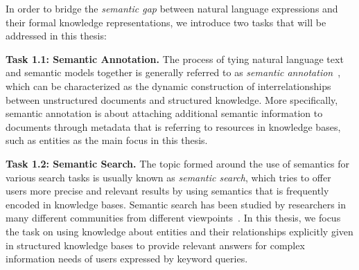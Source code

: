 

In order to bridge the \emph{semantic gap} between natural language expressions and their formal knowledge representations, we introduce two tasks that will be addressed in this thesis:

\noindent  \textbf{Task 1.1: Semantic Annotation.} 
The process of tying natural language text and semantic models together is generally referred to as \emph{semantic annotation}~\cite{DBLP:reference/sp/BontchevaC11}, which can be characterized as the dynamic construction of interrelationships between unstructured documents and structured knowledge. More specifically, semantic annotation is about attaching additional semantic information to documents through metadata that is referring to resources in knowledge bases, such as entities as the main focus in this thesis.

\noindent  \textbf{Task 1.2: Semantic Search.} 
The topic formed around the use of semantics for various search tasks is usually known as \emph{semantic search}, which tries to offer users more precise and relevant results by using semantics that is frequently encoded in knowledge bases. Semantic search has been studied by researchers in many different communities from different viewpoints~\cite{DBLP:journals/ws/TranHL11,DBLP:conf/promisews/BontchevaTC13}. In this thesis, we focus the task on using knowledge about entities and their relationships explicitly given in structured knowledge bases to provide relevant answers for complex information needs of users expressed by keyword queries.

